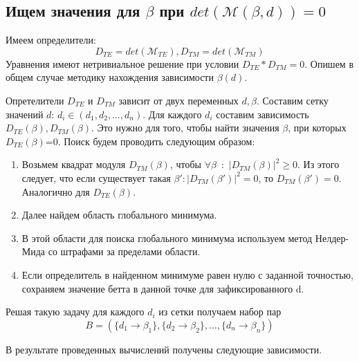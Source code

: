 \documentclass{article}
\begin{document}
\subsection{Ищем значения для $\beta$ при $det(\mathcal{M}(\beta, d)) = 0$ }

Имеем определители: $$D_{TE} = det(\mathcal{M}_{TE}), D_{TM} = det(\mathcal{M}_{TM})$$
Уравнения имеют нетривиальное решение при условии $D_{TE} * D_{TM} = 0$. Опишем в общем случае методику нахождения зависимости $\beta(d)$.
\par Опретелители $D_{TE}$ и $D_{TM}$ зависит от двух переменных $d, \beta$. Составим сетку значений $d$: $d_i \in (d_1, d_2, \ldots, d_n)$. Для каждого $d_i$ составим зависимость $D_{TE}(\beta), D_{TM}(\beta)$. Это нужно для того, чтобы найти значения $\beta$, при которых $D_{TE}(\beta)$=0. Поиск будем проводить следующим образом: \begin{enumerate}
    \item Возьмем квадрат модуля $D_{TM}(\beta)$, чтобы  $\forall \beta$~:~$|D_{TM}(\beta)|^2 \geq 0$. Из этого следует, что если существует такая $\beta': |D_{TM}(\beta')|^2 = 0 $, то $ D_{TM}(\beta') = 0$. Аналогично для $D_{TE}(\beta)$.
    \item Далее найдем область глобального минимума.
    \item В этой области для поиска глобального минимума используем метод Нелдер-Мида со штрафами за пределами области.
    \item Если определитель в найденном минимуме равен нулю с заданной точностью, сохраняем значение бетта в данной точке для зафиксированного d. 
\end{enumerate}

Решая такую задачу для каждого $d_i$ из сетки получаем набор пар $$B = \left( \{d_1 \to \beta_1\}, \{d_2 \to \beta_2\}, \ldots, \{d_n \to \beta_n\}  \right )$$

В результате проведенных вычислений получены следующие зависимости.
\end{document}
